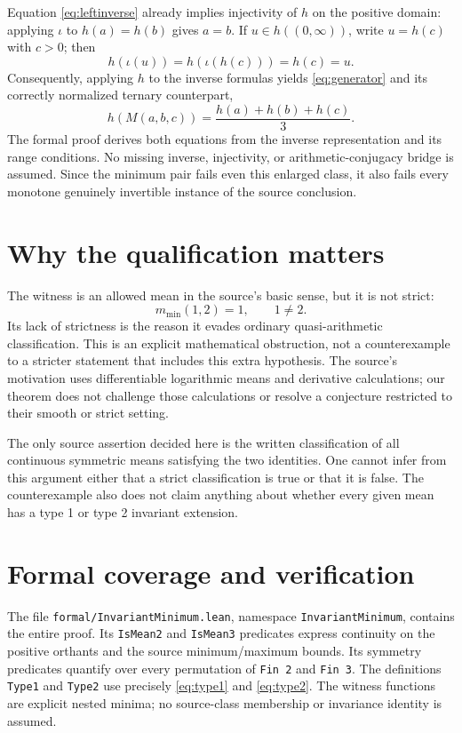 \documentclass[11pt]{article}
\begin{document}
Equation \eqref{eq:leftinverse} already implies injectivity of $h$ on the positive domain: applying $\iota$ to $h(a)=h(b)$ gives $a=b$. If $u\in h((0,\infty))$, write $u=h(c)$ with $c>0$; then
\[
 h(\iota(u))=h(\iota(h(c)))=h(c)=u.
\]
Consequently, applying $h$ to the inverse formulas yields \eqref{eq:generator} and its correctly normalized ternary counterpart,
\[
 h(M(a,b,c))=\frac{h(a)+h(b)+h(c)}3.
\]
The formal proof derives both equations from the inverse representation and its range conditions. No missing inverse, injectivity, or arithmetic-conjugacy bridge is assumed. Since the minimum pair fails even this enlarged class, it also fails every monotone genuinely invertible instance of the source conclusion.

\section{Why the qualification matters}
The witness is an allowed mean in the source's basic sense, but it is not strict:
\[
 m_{\min}(1,2)=1,\qquad 1\ne2.
\]
Its lack of strictness is the reason it evades ordinary quasi-arithmetic classification. This is an explicit mathematical obstruction, not a counterexample to a stricter statement that includes this extra hypothesis. The source's motivation uses differentiable logarithmic means and derivative calculations; our theorem does not challenge those calculations or resolve a conjecture restricted to their smooth or strict setting.

The only source assertion decided here is the written classification of all continuous symmetric means satisfying the two identities. One cannot infer from this argument either that a strict classification is true or that it is false. The counterexample also does not claim anything about whether every given mean has a type 1 or type 2 invariant extension.

\section{Formal coverage and verification}
The file \texttt{formal/InvariantMinimum.lean}, namespace \texttt{InvariantMinimum}, contains the entire proof. Its \texttt{IsMean2} and \texttt{IsMean3} predicates express continuity on the positive orthants and the source minimum/maximum bounds. Its symmetry predicates quantify over every permutation of \texttt{Fin 2} and \texttt{Fin 3}. The definitions \texttt{Type1} and \texttt{Type2} use precisely \eqref{eq:type1} and \eqref{eq:type2}. The witness functions are explicit nested minima; no source-class membership or invariance identity is assumed.
\end{document}
